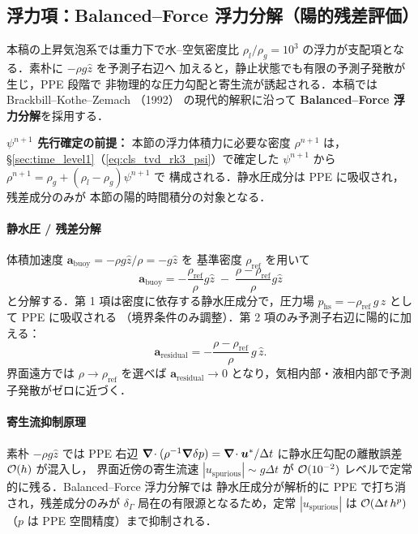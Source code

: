\subsection{浮力項：Balanced--Force 浮力分解（陽的残差評価）}
\label{sec:time_buoyancy}

本稿の上昇気泡系では重力下で水--空気密度比 $\rho_l/\rho_g = 10^3$
の浮力が支配項となる．素朴に $-\rho g \hat{z}$ を予測子右辺へ
加えると，静止状態でも有限の予測子発散が生じ，PPE 段階で
非物理的な圧力勾配と寄生流が誘起される．本稿では Brackbill--Kothe--Zemach
（1992）\cite{Brackbill1992} の現代的解釈に沿って
\textbf{Balanced--Force 浮力分解}を採用する．

\noindent\textbf{$\psi^{n+1}$ 先行確定の前提：}
本節の浮力体積力に必要な密度 $\rho^{n+1}$ は，
§\ref{sec:time_level1}（\eqref{eq:cls_tvd_rk3_psi}）で確定した
$\psi^{n+1}$ から $\rho^{n+1}=\rho_g+(\rho_l-\rho_g)\psi^{n+1}$ で
構成される．静水圧成分は PPE に吸収され，残差成分のみが
本節の陽的時間積分の対象となる．

\paragraph{静水圧 / 残差分解}
体積加速度 $\bm{a}_{\mathrm{buoy}} = -\rho g \hat{z}/\rho = -g\hat{z}$ を
基準密度 $\rho_{\mathrm{ref}}$ を用いて
\begin{equation}
  \bm{a}_{\mathrm{buoy}} = -\frac{\rho_{\mathrm{ref}}}{\rho}g\hat{z}
                       \;-\;\frac{\rho - \rho_{\mathrm{ref}}}{\rho}g\hat{z}
  \label{eq:buoy_split}
\end{equation}
と分解する．第 1 項は密度に依存する静水圧成分で，圧力場
$p_{\mathrm{hs}} = -\rho_{\mathrm{ref}}\,g\,z$ として PPE に吸収される
（境界条件のみ調整）．第 2 項のみ予測子右辺に陽的に加える：
\begin{equation}
  \bm{a}_{\mathrm{residual}} = -\frac{\rho - \rho_{\mathrm{ref}}}{\rho}\,g\,\hat{z}.
  \label{eq:buoy_residual}
\end{equation}
界面遠方では $\rho \to \rho_{\mathrm{ref}}$ を選べば $\bm{a}_{\mathrm{residual}}\to 0$
となり，気相内部・液相内部で予測子発散がゼロに近づく．

\paragraph{寄生流抑制原理}
素朴 $-\rho g \hat{z}$ では PPE 右辺
$\bm{\nabla}\!\cdot(\rho^{-1}\bm{\nabla}\delta p) = \bm{\nabla}\!\cdot\bm{u}^{*}/\Delta t$
に静水圧勾配の離散誤差 $\mathcal{O}(h)$ が混入し，
界面近傍の寄生流速 $|u_{\mathrm{spurious}}| \sim g\Delta t$ が
$\mathcal{O}(10^{-2})$ レベルで定常的に残る．Balanced--Force 浮力分解では
静水圧成分が解析的に PPE で打ち消され，残差成分のみが
$\delta_\Gamma$ 局在の有限源となるため，定常 $|u_{\mathrm{spurious}}|$
は $\mathcal{O}(\Delta t\,h^{p})$（$p$ は PPE 空間精度）まで抑制される．

